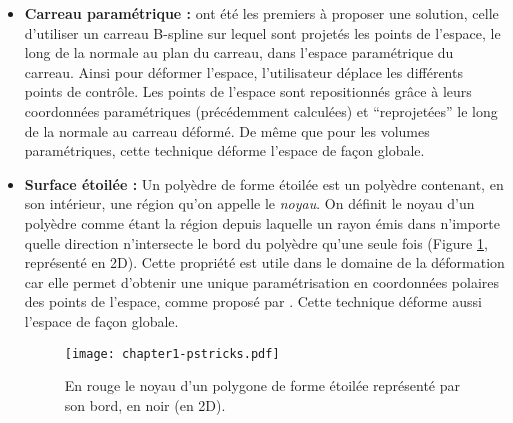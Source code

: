 \begin{itemize}
\item{\textbf{Carreau paramétrique :}} \cite{JLQ96} ont été les
  premiers à proposer une solution, celle d'utiliser un carreau
  B-spline sur lequel sont projetés les points de l'espace, le long de
  la normale au plan du carreau, dans l'espace paramétrique du
  carreau. Ainsi pour déformer l'espace, l'utilisateur déplace les
  différents points de contrôle. Les points de l'espace sont
  repositionnés grâce à leurs coordonnées paramétriques (précédemment
  calculées) et ``reprojetées'' le long de la normale au carreau
  déformé. De même que pour les volumes paramétriques, cette technique
  déforme l'espace de façon globale.
\item{\textbf{Surface étoilée :}} Un polyèdre de forme étoilée est un
  polyèdre contenant, en son intérieur, une région qu'on appelle le
  \textit{noyau}. On définit le noyau d'un polyèdre comme étant la
  région depuis laquelle un rayon émis dans n'importe quelle direction
  n'intersecte le bord du polyèdre qu'une seule fois (Figure
  \ref{SUReto}, représenté en 2D). Cette propriété est utile dans le
  domaine de la déformation car elle permet d'obtenir une unique
  paramétrisation en coordonnées polaires des points de l'espace,
  comme proposé par \cite{JL00}. Cette technique déforme aussi
  l'espace de façon globale.

  \begin{figure}[h]
    \begin{center}
      \texttt{[image: chapter1-pstricks.pdf]}
      \caption{En rouge le noyau d'un polygone de forme étoilée
        représenté par son bord, en noir (en 2D).}
      \label{SUReto}
    \end{center}
  \end{figure}


\end{itemize}
